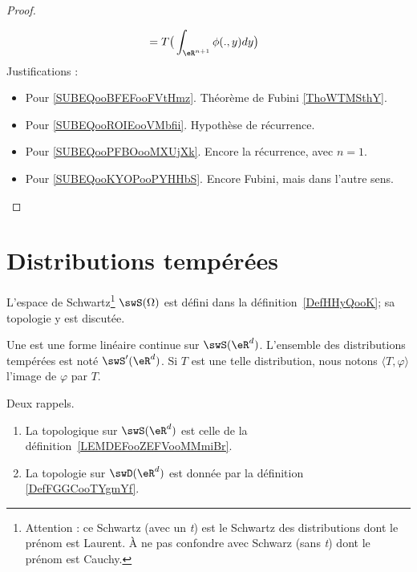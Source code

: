 \begin{proof}
\begin{subproof}
\begin{subequations}
\begin{align}
				                                         & =T\big( \int_{\eR^{n+1}}\phi(.,y)dy \big)      \label{SUBEQooKYOPooPYHHbS}
			\end{align}
		\end{subequations}
		Justifications :
		\begin{itemize}
			\item Pour \eqref{SUBEQooBFEFooFVtHmz}. Théorème de Fubini \ref{ThoWTMSthY}.
			\item Pour \eqref{SUBEQooROIEooVMbfii}. Hypothèse de récurrence.
			\item Pour \eqref{SUBEQooPFBOooMXUjXk}. Encore la récurrence, avec \( n=1\).
			\item Pour \eqref{SUBEQooKYOPooPYHHbS}. Encore Fubini, mais dans l'autre sens.
		\end{itemize}

	\end{subproof}
\end{proof}

\section{Distributions tempérées}

L'espace de Schwartz\footnote{Attention : ce Schwartz (avec un \emph{t}) est le Schwartz des distributions dont le prénom est Laurent. À ne pas confondre avec Schwarz (sans \emph{t}) dont le prénom est Cauchy.} \( \swS(\Omega)\) est défini dans la définition~\ref{DefHHyQooK}; sa topologie y est discutée.
\begin{definition}
	Une  est une forme linéaire continue sur \( \swS(\eR^d)\). L'ensemble des distributions tempérées est noté \( \swS'(\eR^d)\). Si \( T\) est une telle distribution, nous notons \( \langle T, \varphi\rangle\) l'image de \( \varphi\) par \( T\).
\end{definition}

\begin{normaltext}
	Deux rappels.
	\begin{enumerate}
		\item
		      La topologique sur \( \swS(\eR^d)\) est celle de la définition~\ref{LEMDEFooZEFVooMMmiBr}.
		\item
		      La topologie sur \( \swD(\eR^d)\) est donnée par la définition \ref{DefFGGCooTYgmYf}.
	\end{enumerate}
\end{normaltext}




